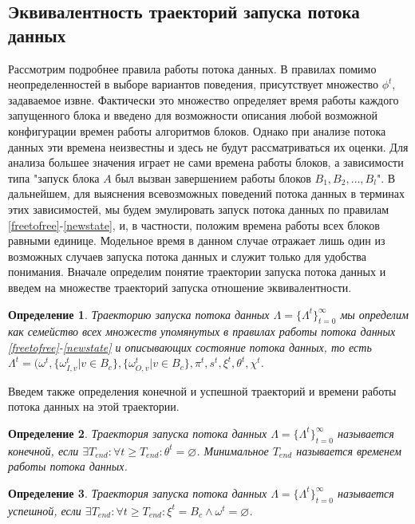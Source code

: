 \documentclass[10pt,a4paper]{article}
\newtheorem{defen}{Определение}
\begin{document}
\subsection{Эквивалентность траекторий запуска потока данных}
  Рассмотрим подробнее правила работы потока данных. В правилах помимо неопределенностей в выборе вариантов поведения, присутствует множество $\phi^t$, задаваемое извне.
  Фактически это множество определяет время работы каждого запущенного блока и введено для возможности описания любой возможной конфигурации времен работы алгоритмов блоков.
  Однако при анализе потока данных эти времена неизвестны и здесь не будут рассматриваться их оценки. Для анализа большее значения играет не сами времена работы блоков, а
  зависимости типа "запуск блока $A$ был вызван завершением работы блоков $B_1, B_2, \dots, B_l$".
  В дальнейшем, для выяснения всевозможных поведений потока данных в терминах этих зависимостей,
  мы будем эмулировать запуск потока данных по правилам \eqref{freetofree}-\eqref{newstate}, и, в частности, положим времена работы всех блоков равными единице.
  Модельное время в данном случае отражает лишь один из возможных случаев запуска потока данных и служит только для удобства понимания.
  Вначале определим понятие траектории запуска потока данных и введем на множестве траекторий запуска отношение эквивалентности.
  
  \begin{defen}
    Траекторию запуска потока данных $\Lambda = \{\Lambda^t\}_{t=0}^{\infty}$ мы определим как семейство всех множеств упомянутых в
    правилах работы потока данных \eqref{freetofree}-\eqref{newstate} и описывающих состояние потока данных,
    то есть $\Lambda^t = (\omega^t, \{\omega^t_{I, v} \vert v \in B_c\}, \{\omega^t_{O, v} \vert v \in B_c\}, \pi^t, s^t, \xi^t, \theta^t, \chi^t$.
  \end{defen}
  
  Введем также определения конечной и успешной траекторий и времени работы потока данных на этой траектории.
  \begin{defen}
    Траектория запуска потока данных $\Lambda = \{\Lambda^t\}_{t=0}^{\infty}$ называется конечной, если
    $\exists T_{end}: \forall t \geq T_{end}: \theta^t = \varnothing$. Минимальное $T_{end}$ называется временем работы потока данных.
    \label{def:trajectory_finite}
  \end{defen}
  
  \begin{defen}
    Траектория запуска потока данных $\Lambda = \{\Lambda^t\}_{t=0}^{\infty}$ называется успешной, если
    $\exists T_{end}: \forall t \geq T_{end} : \xi^t = B_c \wedge \omega^t = \varnothing$.
    \label{def:trajectory_success}
  \end{defen}
  
\end{document}
